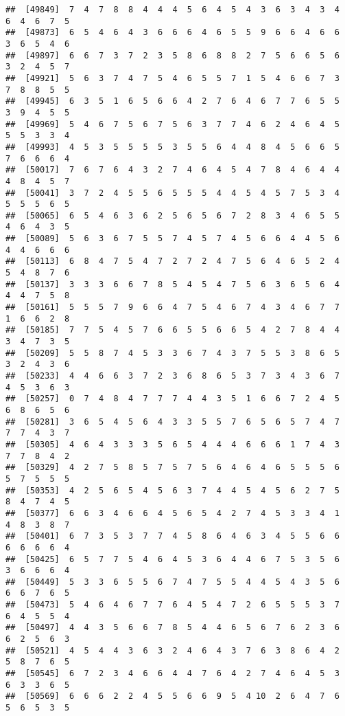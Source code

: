 \documentclass[
]{book}
\begin{document}
\begin{verbatim}
##  [49849]  7  4  7  8  8  4  4  4  5  6  4  5  4  3  6  3  4  3  4  6  4  6  7  5
##  [49873]  6  5  4  6  4  3  6  6  6  4  6  5  5  9  6  6  4  6  6  3  6  5  4  6
##  [49897]  6  6  7  3  7  2  3  5  8  6  8  8  2  7  5  6  6  5  6  3  2  4  5  7
##  [49921]  5  6  3  7  4  7  5  4  6  5  5  7  1  5  4  6  6  7  3  7  8  8  5  5
##  [49945]  6  3  5  1  6  5  6  6  4  2  7  6  4  6  7  7  6  5  5  3  9  4  5  5
##  [49969]  5  4  6  7  5  6  7  5  6  3  7  7  4  6  2  4  6  4  5  5  5  3  3  4
##  [49993]  4  5  3  5  5  5  5  3  5  5  6  4  4  8  4  5  6  6  5  7  6  6  6  4
##  [50017]  7  6  7  6  4  3  2  7  4  6  4  5  4  7  8  4  6  4  4  4  8  4  5  7
##  [50041]  3  7  2  4  5  5  6  5  5  5  4  4  5  4  5  7  5  3  4  5  5  5  6  5
##  [50065]  6  5  4  6  3  6  2  5  6  5  6  7  2  8  3  4  6  5  5  4  6  4  3  5
##  [50089]  5  6  3  6  7  5  5  7  4  5  7  4  5  6  6  4  4  5  6  4  4  6  6  6
##  [50113]  6  8  4  7  5  4  7  2  7  2  4  7  5  6  4  6  5  2  4  5  4  8  7  6
##  [50137]  3  3  3  6  6  7  8  5  4  5  4  7  5  6  3  6  5  6  4  4  4  7  5  8
##  [50161]  5  5  5  7  9  6  6  4  7  5  4  6  7  4  3  4  6  7  7  1  6  6  2  8
##  [50185]  7  7  5  4  5  7  6  6  5  5  6  6  5  4  2  7  8  4  4  3  4  7  3  5
##  [50209]  5  5  8  7  4  5  3  3  6  7  4  3  7  5  5  3  8  6  5  3  2  4  3  6
##  [50233]  4  4  6  6  3  7  2  3  6  8  6  5  3  7  3  4  3  6  7  4  5  3  6  3
##  [50257]  0  7  4  8  4  7  7  7  4  4  3  5  1  6  6  7  2  4  5  6  8  6  5  6
##  [50281]  3  6  5  4  5  6  4  3  3  5  5  7  6  5  6  5  7  4  7  7  7  4  3  7
##  [50305]  4  6  4  3  3  3  5  6  5  4  4  4  6  6  6  1  7  4  3  7  7  8  4  2
##  [50329]  4  2  7  5  8  5  7  5  7  5  6  4  6  4  6  5  5  5  6  5  7  5  5  5
##  [50353]  4  2  5  6  5  4  5  6  3  7  4  4  5  4  5  6  2  7  5  8  4  7  4  5
##  [50377]  6  6  3  4  6  6  4  5  6  5  4  2  7  4  5  3  3  4  1  4  8  3  8  7
##  [50401]  6  7  3  5  3  7  7  4  5  8  6  4  6  3  4  5  5  6  6  6  6  6  6  4
##  [50425]  6  5  7  7  5  4  6  4  5  3  6  4  4  6  7  5  3  5  6  3  6  6  6  4
##  [50449]  5  3  3  6  5  5  6  7  4  7  5  5  4  4  5  4  3  5  6  6  6  7  6  5
##  [50473]  5  4  6  4  6  7  7  6  4  5  4  7  2  6  5  5  5  3  7  6  4  5  5  4
##  [50497]  4  4  3  5  6  6  7  8  5  4  4  6  5  6  7  6  2  3  6  6  2  5  6  3
##  [50521]  4  5  4  4  3  6  3  2  4  6  4  3  7  6  3  8  6  4  2  5  8  7  6  5
##  [50545]  6  7  2  3  4  6  6  4  4  7  6  4  2  7  4  6  4  5  3  6  3  3  6  5
##  [50569]  6  6  6  2  2  4  5  5  6  6  9  5  4 10  2  6  4  7  6  5  6  5  3  5

\end{verbatim}
\end{document}

